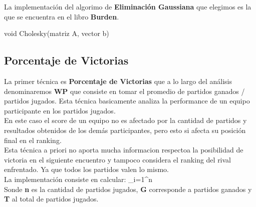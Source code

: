 La implementación del algorimo de \textbf{Eliminación Gaussiana} que elegimos es la que se encuentra en el libro \textbf{Burden}. \\


\begin{algorithm}
\begin{algorithmic}[1]\parskip=1mm
\caption{void Cholesky(matriz A, vector b)}
\end{algorithmic}
\end{algorithm}


\subsection{Porcentaje de Victorias}

La primer técnica es \textbf{Porcentaje de Victorias} que a lo largo del análisis denominaremos \textbf{WP} que consiste en tomar el promedio de partidos ganados / partidos jugados. Esta técnica basicamente analiza la performance de un equipo participante en los partidos jugados. \\

En este caso el score de un equipo no es afectado por la cantidad de partidos y resultados obtenidos de los demás participantes, pero esto si afecta su posición final en el ranking. \\

Esta técnica a priori no aporta mucha informacion respectoa la posibilidad de victoria en el siguiente encuentro y tampoco considera el ranking del rival enfrentado. Ya que todos los partidos valen lo mismo. \\

La implementación consiste en calcular: \sum_{i=1}^n{}  \\

Sonde \textbf{n} es la cantidad de partidos jugados, \textbf{G} corresponde a partidos ganados y \textbf{T} al total de partidos jugados. \\
